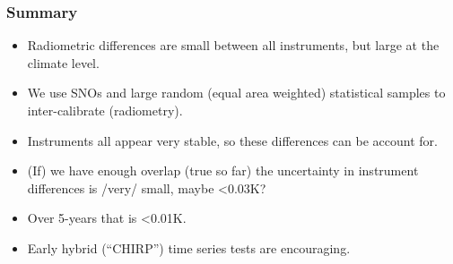 \documentclass[10pt,t]{beamer}
\begin{document}
\begin{frame}
  \frametitle{Summary}
  \begin{itemize}
  \item Radiometric differences are small between all instruments, but large at the climate level.
  \item We use SNOs and large random (equal area weighted) statistical samples to inter-calibrate (radiometry).
  \item Instruments all appear very stable, so these differences can be account for.
  \item (If) we have enough overlap (true so far) the uncertainty in instrument differences is /very/ small, maybe <0.03K?
  \item Over 5-years that is <0.01K.
  \item Early hybrid (``CHIRP'') time series tests are encouraging.
    
  \end{itemize}
  
\end{frame}
%
\end{document}
